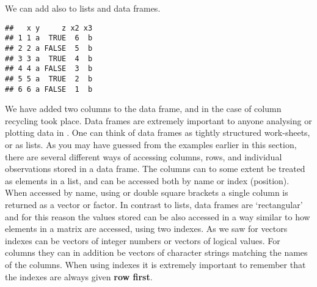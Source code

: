 \documentclass[paper=a4,10pt,div=17,headsepline,BCOR=12mm,twoside,open=right]{scrbook}\usepackage{knitr}
\begin{document}
We can add also to lists and data frames.

\begin{knitrout}\footnotesize
{}\color{fgcolor}\begin{kframe}
\begin{alltt}
\hlopt{$} \hlkwb{<-} \hlopt{:}
\hlopt{$} \hlkwb{<-} 
\end{alltt}
\begin{verbatim}
##   x y     z x2 x3
## 1 1 a  TRUE  6  b
## 2 2 a FALSE  5  b
## 3 3 a  TRUE  4  b
## 4 4 a FALSE  3  b
## 5 5 a  TRUE  2  b
## 6 6 a FALSE  1  b
\end{verbatim}
\end{kframe}
\end{knitrout}

We have added two columns to the data frame, and in the case of column  recycling took place. Data frames are extremely important to anyone analysing or plotting data in \R. One can think of data frames as tightly structured work-sheets, or as lists. As you may have guessed from the examples earlier in this section, there are several different ways of accessing columns, rows, and individual observations stored in a data frame. The columns can to some extent be treated as elements in a list, and can be accessed both by name or index (position). When accessed by name, using \code{\$} or double square brackets a single column is returned as a vector or factor. In contrast to lists, data frames are `rectangular' and for this reason the values stored can be also accessed in a way similar to how elements in a matrix are accessed, using two indexes. As we saw for vectors indexes can be vectors of integer numbers or vectors of logical values. For columns they can in addition be vectors of character strings matching the names of the columns. When using indexes it is extremely important to remember that the indexes are always given \textbf{row first}.
\end{document}
